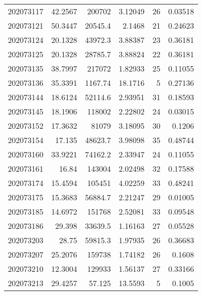 \begin{tabular}{rrrrrr}
 202073117 &         42.2567  &   200702      &            3.12049 &          26 & 0.03518 \\
 202073121 &         50.3447  &    20545.4    &            2.1468  &          21 & 0.24623 \\
 202073124 &         20.1328  &    43972.3    &            3.88387 &          23 & 0.36181 \\
 202073125 &         20.1328  &    28785.7    &            3.88824 &          22 & 0.36181 \\
 202073135 &         38.7997  &   217072      &            1.82933 &          25 & 0.11055 \\
 202073136 &         35.3391  &     1167.74   &           18.1716  &           5 & 0.27136 \\
 202073144 &         18.6124  &    52114.6    &            2.93951 &          31 & 0.18593 \\
 202073145 &         18.1906  &   118002      &            2.22802 &          24 & 0.03015 \\
 202073152 &         17.3632  &    81079      &            3.18095 &          30 & 0.1206  \\
 202073154 &         17.135   &    48623.7    &            3.98098 &          35 & 0.48744 \\
 202073160 &         33.9221  &    74162.2    &            2.33947 &          24 & 0.11055 \\
 202073161 &         16.84    &   143004      &            2.02498 &          32 & 0.17588 \\
 202073174 &         15.4594  &   105451      &            4.02259 &          33 & 0.48241 \\
 202073175 &         15.3683  &    56884.7    &            2.21247 &          29 & 0.01005 \\
 202073185 &         14.6972  &   151768      &            2.52081 &          33 & 0.09548 \\
 202073186 &         29.398   &    33639.5    &            1.16163 &          27 & 0.05528 \\
 202073203 &         28.75    &    59815.3    &            1.97935 &          26 & 0.36683 \\
 202073207 &         25.2076  &   159738      &            1.74182 &          26 & 0.1608  \\
 202073210 &         12.3004  &   129933      &            1.56137 &          27 & 0.33166 \\
 202073213 &         29.4257  &       57.125  &           13.5593  &           5 & 0.1005  \\

\end{tabular}
